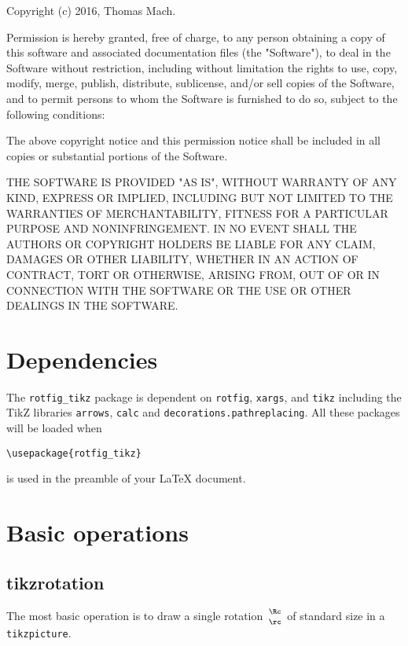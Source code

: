 \documentclass[final]{siamltex}
\begin{document}
Copyright (c) 2016,
Thomas Mach.

Permission is hereby granted, free of charge, to any person obtaining
a copy of this software and associated documentation files (the
"Software"), to deal in the Software without restriction, including
without limitation the rights to use, copy, modify, merge, publish,
distribute, sublicense, and/or sell copies of the Software, and to
permit persons to whom the Software is furnished to do so, subject to
the following conditions:

The above copyright notice and this permission notice shall be
included in all copies or substantial portions of the Software.

THE SOFTWARE IS PROVIDED "AS IS", WITHOUT WARRANTY OF ANY KIND,
EXPRESS OR IMPLIED, INCLUDING BUT NOT LIMITED TO THE WARRANTIES OF
MERCHANTABILITY, FITNESS FOR A PARTICULAR PURPOSE AND
NONINFRINGEMENT. IN NO EVENT SHALL THE AUTHORS OR COPYRIGHT HOLDERS BE
LIABLE FOR ANY CLAIM, DAMAGES OR OTHER LIABILITY, WHETHER IN AN ACTION
OF CONTRACT, TORT OR OTHERWISE, ARISING FROM, OUT OF OR IN CONNECTION
WITH THE SOFTWARE OR THE USE OR OTHER DEALINGS IN THE SOFTWARE.



\section{Dependencies}
The \texttt{rotfig\_tikz} package is dependent on \texttt{rotfig},
\texttt{xargs}, and \texttt{tikz} including the TikZ libraries \texttt{arrows},
\texttt{calc} and \texttt{decorations.pathreplacing}. All these packages will be
loaded when 
\begin{Verbatim}
\usepackage{rotfig_tikz}
\end{Verbatim}
is used in the preamble of your \LaTeX{} document. 

\newpage{}
\section{Basic operations}
\subsection{tikzrotation}
The most basic operation is to draw a single rotation $\begin{smallmatrix}
  \Rc\\[0.7ex] \rc \end{smallmatrix}$ of standard size in a
\texttt{tikzpicture}.
\end{document}
